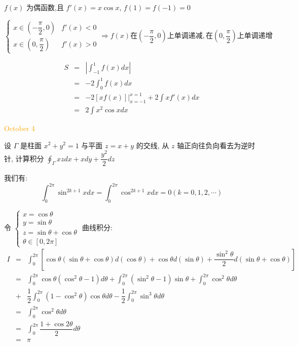 \begin{solution}

	$f(x)$ 为偶函数,且 $f'(x)=x\cos x$, $f(1)=f(-1)=0$  

	$$\begin{cases}
		x\in(-\dfrac{\pi}{2},0) & f'(x)<0\\
		x\in(0,\dfrac{\pi}{2}) & f'(x)>0
	\end{cases}\Rightarrow
	 f(x) \text{在}(-\dfrac{\pi}{2},0)\text{上单调递减},
	 \text{在}(0,\dfrac{\pi}{2})\text{上单调递增}$$
	
	\begin{eqnarray*}
		S & = & |\int_{-1}^{1}f(x)dx|\\
		  & = & -2\int_{0}^{1}f(x)dx\\
		  & = & -2[xf(x)]\big|_{x=-1}^{x=1} + 2\int xf'(x)dx\\
		  & = & 2\int x^{2}\cos xdx
	\end{eqnarray*}
\end{solution}


\textcolor{orange}{October 4}

\begin{example}[][Exam: 36.1.7]
	设 $\varGamma$ 是柱面 $x^{2}+y^{2}=1$ 与平面 $z=x+y$ 的交线,
从 $z$ 轴正向往负向看去为逆时针, 计算积分 $\displaystyle{\oint_{\varGamma}xzdx+xdy+\dfrac{y^2}{2}dz}$
\end{example}

\begin{solution}

	我们有:
	$$\int_{0}^{2\pi}\sin^{2k+1}xdx = \int_{0}^{2\pi}\cos^{2k+1}xdx = 0(k=0,1,2,\cdots)$$
	
	令 $\begin{cases}
		x = \cos \theta \\
		y = \sin \theta \\
		z = \sin \theta + \cos \theta \\
		\theta \in [0,2\pi]
	\end{cases}$  曲线积分:
	\begin{eqnarray*}
		  I & = & \int_{0}^{2\pi}\left[ \cos\theta(\sin\theta+\cos\theta)d(\cos\theta)
		   	      + \cos\theta d(\sin\theta) + \dfrac{\sin^{2}\theta}{2}d(\sin\theta+\cos\theta)\right]\\
			& = & \int_{0}^{2\pi}\cos\theta(\cos^{2}\theta-1)d\theta + \int_{0}^{2\pi}(\sin^{2}\theta-1)\sin\theta
				  + \int_{0}^{2\pi}\cos^{2}\theta d\theta \\
			& + & \dfrac{1}{2}\int_{0}^{2\pi}(1-\cos^{2}\theta)\cos\theta d\theta - \dfrac{1}{2}\int_{0}^{2\pi}\sin^{3}\theta d\theta\\
			& = & \int_{0}^{2\pi}\cos^{2}\theta d\theta\\
			& = & \int_{0}^{2\pi}\dfrac{1+\cos2\theta}{2}d\theta\\
			& = & \pi
	\end{eqnarray*}
\end{solution}

